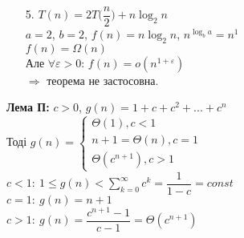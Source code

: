 \documentclass[a4paper,12pt]{article}
\newcommand{\dsum}{\displaystyle\sum}
\begin{document}
\newpage
    \begin{enumerate}
        \item[5.] $T(n)=2T\Biggl(\dfrac{n}{2}\Biggr)+n\log_2n$ \\
        $a=2$, $b=2$, $f(n)=n\log_2n$, $n^{\log_ba}=n^1$ \\
        $f(n)=\Omega(n)$ \\
        Але $\forall\varepsilon>0$: $f(n)=o(n^{1+\varepsilon})$ \\
        $\Rightarrow$ теорема не застосовна.
    \end{enumerate}
    \textbf{Лема П:} $c>0$, $g(n)=1+c+c^2+...+c^n$ \\
    Тоді $g(n)=\begin{cases}
        \Theta(1), c<1 \\
        n+1=\Theta(n), c=1 \\
        \Theta(c^{n+1}), c>1
    \end{cases}$ \\
    $c<1:\: 1\leqslant g(n)<\dsum\limits_{k=0}^{\infty}c^k=\dfrac{1}{1-c}=const$ \\
    $c=1:\: g(n)=n+1$ \\
    $c>1:\: g(n)=\dfrac{c^{n+1}-1}{c-1}=\Theta(c^{n+1})$
\end{document}
